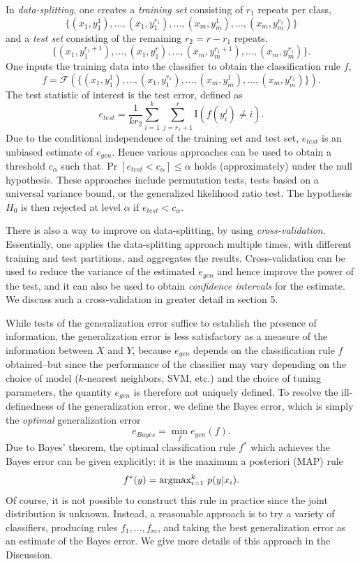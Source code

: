 \documentclass[12pt]{article}
\begin{document}
In \emph{data-splitting}, one creates a \emph{training
set} consisting of $r_1$ repeats per class,
\[
\{(x_1, y_1^1),\hdots, (x_1,y_1^{r_1}), \hdots, (x_m, y_m^1),\hdots, (x_m,y_m^{r_1})\}
\]
and a \emph{test set} consisting of the remaining $r_2 = r - r_1$ repeats.
\[
\{(x_1, y_1^{r_1 + 1}),\hdots, (x_1,y_1^{r}), \hdots, (x_m, y_m^{r_1 + 1}),\hdots, (x_m,y_m^{r_1})\}.
\]
One inputs the training data into the classifier to obtain the classification rule $f$,
\[
f = \mathcal{F}(\{(x_1, y_1^1),\hdots, (x_1,y_1^{r_1}), \hdots, (x_m, y_m^1),\hdots, (x_m,y_m^{r_1})\}).
\]
The test statistic of interest is the test error,
defined as
\[
e_{test} = \frac{1}{k r_2} \sum_{i=1}^k \sum_{j = r_1 + 1}^r \text{I}(f(y_i^j) \neq i).
\]
Due to the conditional independence of the training set and test set,
$e_{test}$ is an unbiased estimate of $e_{gen}$.  Hence various
approaches can be used to obtain a threshold $c_\alpha$ such that
$\Pr[e_{test} < c_\alpha] \leq \alpha$ holds (approximately) under the
null hypothesis.  These approaches include permutation tests, tests
based on a universal variance bound, or the generalized likelihood
ratio test.  The hypothesis $H_0$ is then rejected at level $\alpha$
if $e_{test} < c_\alpha$.

There is also a way to improve on data-splitting, by
using \emph{cross-validation}. Essentially, one applies the
data-splitting approach multiple times, with different training and
test partitions, and aggregates the results. Cross-validation can be
used to reduce the variance of the estimated $e_{gen}$ and hence
improve the power of the test, and it can also be used to
obtain \emph{confidence intervals} for the estimate.  We discuss such
a cross-validation in greater detail in section 5.

While tests of the generalization error suffice to establish the
presence of information, the generalization error is less satisfactory
as a measure of the information between $X$ and $Y$, because
$e_{gen}$ depends on the classification rule $f$ obtained--but since the performance of the classifier
may vary depending on the choice of model ($k$-nearest neighbors, SVM, etc.) and the choice of tuning parameters,
the quantity $e_{gen}$ is therefore not uniquely defined.
To resolve the ill-definedness of the generalization error, we define
the Bayes error, which is simply the \emph{optimal}
generalization error
\[
e_{Bayes} = \min_f e_{gen}(f).
\]
Due to Bayes' theorem, the optimal classification rule $f^*$ which
achieves the Bayes error can be given explicitly: it is the maximum a
posteriori (MAP) rule
\[
f^*(y) = \text{argmax}_{i=1}^k\ p(y|x_i).
\]
Of course, it is not possible to construct this rule in practice since
the joint distribution is unknown.  Instead, a reasonable approach is
to try a variety of classifiers, producing rules $f_1,\hdots, f_m$,
and taking the best generalization error as an estimate of the Bayes
error.  We give more details of this approach in the Discussion.
\end{document}
